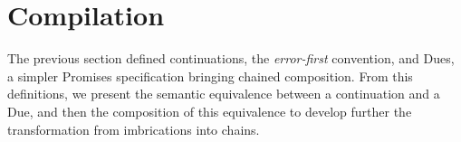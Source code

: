 \section{Compilation} \label{section:equivalence}

The previous section defined continuations, the \textit{error-first} convention, and Dues, a simpler Promises specification bringing chained composition.
From this definitions, we present the semantic equivalence between a continuation and a Due, and then the composition of this equivalence to develop further the transformation from imbrications into chains.






